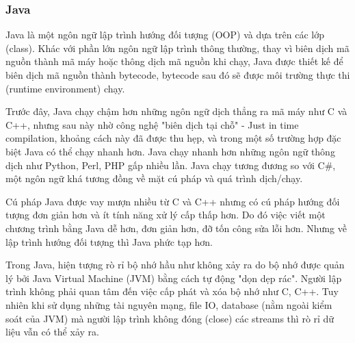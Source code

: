 \subsubsection{Java}
\begin{center}
  \captionsetup{type=figure}
  
\end{center}

Java là một ngôn ngữ lập trình hướng đối tượng (OOP) và dựa trên các lớp (class). Khác với phần lớn ngôn ngữ lập trình thông thường, thay vì biên dịch mã nguồn thành mã máy hoặc thông dịch mã nguồn khi chạy, Java được thiết kế để biên dịch mã nguồn thành bytecode, bytecode sau đó sẽ được môi trường thực thi (runtime environment) chạy.

Trước đây, Java chạy chậm hơn những ngôn ngữ dịch thẳng ra mã máy như C và C++, nhưng sau này nhờ công nghệ "biên dịch tại chỗ" - Just in time compilation, khoảng cách này đã được thu hẹp, và trong một số trường hợp đặc biệt Java có thể chạy nhanh hơn. Java chạy nhanh hơn những ngôn ngữ thông dịch như Python, Perl, PHP gấp nhiều lần. Java chạy tương đương so với C\#, một ngôn ngữ khá tương đồng về mặt cú pháp và quá trình dịch/chạy.

Cú pháp Java được vay mượn nhiều từ C và C++ nhưng có cú pháp hướng đối tượng đơn giản hơn và ít tính năng xử lý cấp thấp hơn. Do đó việc viết một chương trình bằng Java dễ hơn, đơn giản hơn, đỡ tốn công sửa lỗi hơn. Nhưng về lập trình hướng đối tượng thì Java phức tạp hơn.

Trong Java, hiện tượng rò rỉ bộ nhớ hầu như không xảy ra do bộ nhớ được quản lý bởi Java Virtual Machine (JVM) bằng cách tự động "dọn dẹp rác". Người lập trình không phải quan tâm đến việc cấp phát và xóa bộ nhớ như C, C++. Tuy nhiên khi sử dụng những tài nguyên mạng, file IO, database (nằm ngoài kiểm soát của JVM) mà người lập trình không đóng (close) các streams thì rò rỉ dữ liệu vẫn có thể xảy ra.


